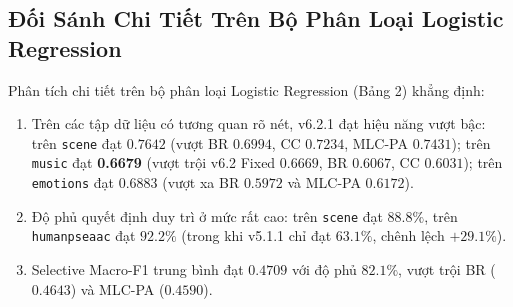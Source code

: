 \documentclass[10pt,a4paper,twoside]{article}
\begin{document}
\subsection{Đối Sánh Chi Tiết Trên Bộ Phân Loại Logistic Regression}
Phân tích chi tiết trên bộ phân loại Logistic Regression (Bảng 2) khẳng định:
\begin{enumerate}[leftmargin=*]
    \item Trên các tập dữ liệu có tương quan rõ nét, v6.2.1 đạt hiệu năng vượt bậc: trên \texttt{scene} đạt $0.7642$ (vượt BR $0.6994$, CC $0.7234$, MLC-PA $0.7431$); trên \texttt{music} đạt \textbf{0.6679} (vượt trội v6.2 Fixed $0.6669$, BR $0.6067$, CC $0.6031$); trên \texttt{emotions} đạt $0.6883$ (vượt xa BR $0.5972$ và MLC-PA $0.6172$).
    \item Độ phủ quyết định duy trì ở mức rất cao: trên \texttt{scene} đạt $88.8\%$, trên \texttt{humanpseaac} đạt $92.2\%$ (trong khi v5.1.1 chỉ đạt $63.1\%$, chênh lệch $+29.1\%$).
    \item Selective Macro-F1 trung bình đạt $0.4709$ với độ phủ $82.1\%$, vượt trội BR ($0.4643$) và MLC-PA ($0.4590$).
\end{enumerate}
\end{document}
